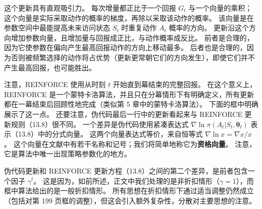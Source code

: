 \documentclass[UTF8, 12pt, fontset=fandol, oneside]{ctexart}
\begin{document}
这个更新具有直观吸引力。
每次增量都正比于一个回报 $G_t$ 与一个向量的乘积；这个向量是实际采取动作的概率的梯度，再除以采取该动作的概率。
该向量是在参数空间中最能提高未来访问状态 $S_t$ 时重复动作 $A_t$ 概率的方向。
更新沿这个方向增加参数向量，且增加量与回报成正比，与动作概率成反比。
前者是合理的，因为它使参数在偏向产生最高回报动作的方向上移动最多。
后者也是合理的，因为否则被频繁选择的动作将占优势（更新更常朝它们的方向发生），即使它们并不产生最高回报，也可能胜出。

注意，REINFORCE 使用从时刻 $t$ 开始直到幕结束的完整回报。
在这个意义上，REINFORCE 是一个蒙特卡洛算法，并且只在分幕情形下有明确定义，所有更新都在一幕结束后回顾性地完成（类似第 5 章中的蒙特卡洛算法）。
下面的框中明确展示了这一点。
还要注意，伪代码最后一行中的更新看起来与 REINFORCE 更新规则（13.8）很不同。
一个差异是伪代码使用紧凑表达式 $\nabla\ln\pi(A_t|S_t,\boldsymbol{\theta}_t)$ 表示（13.8）中的分式向量。
这两个向量表达式等价，来自恒等式 $\nabla\ln x=\nabla x/x$。
这个向量在文献中有若干名称和记号；我们将简单地称它为\textbf{资格向量}。
注意，它是算法中唯一出现策略参数化的地方。

\begin{center}
\end{center}

伪代码更新和 REINFORCE 更新方程（13.8）之间的第二个差异，是前者包含一个因子 $\gamma^t$。
这是因为，如前所述，正文中我们处理的是非折扣情形（$\gamma=1$），而框中算法给出的是一般折扣情形。
所有思想在折扣情形下通过适当调整仍然成立（包括对第 199 页框的调整），但这会引入额外复杂性，分散对主要思想的注意。
\end{document}
